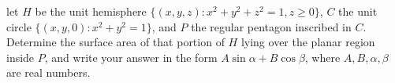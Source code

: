 let $H$ be the unit hemisphere $\{(x,y,z):x^2+y^2+z^2=1,z\geq 0\}$, $C$
the unit circle $\{(x,y,0):x^2+y^2=1\}$, and $P$ the regular pentagon
inscribed in $C$.  Determine the surface area of that portion of $H$ lying
over the planar region inside $P$, and write your answer in the form
$A \sin\alpha + B \cos\beta$, where $A,B,\alpha,\beta$ are real numbers.
